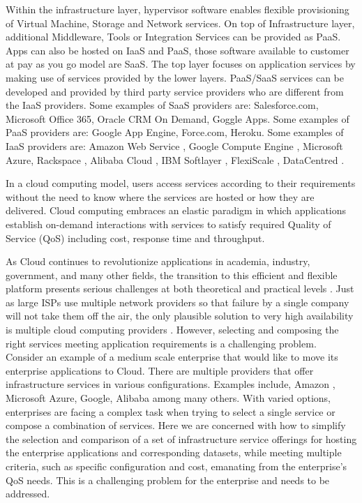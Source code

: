 Within the infrastructure layer, hypervisor software \cite{xen}
enables flexible provisioning of Virtual Machine, Storage and Network services.
On top of Infrastructure layer, additional Middleware, Tools or Integration Services can be provided as PaaS. Apps can also be hosted on IaaS and PaaS, those software available to customer at pay as you go model are SaaS.
The top layer focuses on application services by making
use of services provided by the lower layers. PaaS/SaaS
services can be developed and provided by third party
service providers who are different from the IaaS providers.
Some examples of SaaS providers are: Salesforce.com, Microsoft Office 365,
Oracle CRM On Demand, Goggle Apps.
Some examples of PaaS providers are: Google App Engine,
Force.com, Heroku. 
Some examples of IaaS providers are: Amazon Web Service \cite{aws}, Google Compute Engine \cite{google_cloud}, Microsoft Azure, Rackspace \cite{Rackspace}, Alibaba Cloud \cite{Alibaba}, IBM Softlayer \cite{IBMSoftLayer}, FlexiScale \cite{FlexiScale}, DataCentred \cite{DataCentred}.

In a cloud computing model, users access services according
to their requirements without the need to know where the
services are hosted or how they are delivered. 
Cloud computing embraces an elastic paradigm in which applications establish on-demand
interactions with services to satisfy required Quality of Service (QoS) including cost,
response time and throughput.

As Cloud continues to revolutionize applications in academia, industry, government, and many other fields, the transition to this efficient and flexible platform presents serious challenges at both theoretical and practical levels \cite{CloudComputingMethodologySystemsApplications}.
Just as large ISPs use multiple network providers so that failure by a single company
will not take them off the air,
the only plausible solution to very high availability
is multiple cloud computing providers \cite{Armbrust:2010:VCC:1721654.1721672}.
However, selecting and composing the right services
meeting application requirements is a challenging problem.
Consider an example of a medium scale enterprise that would like to move its
enterprise applications to Cloud.
There are multiple providers that offer infrastructure services in various configurations.
Examples include, Amazon , Microsoft Azure, Google, Alibaba among many others.
With varied options, enterprises are facing a complex task when trying to select a single service or compose a combination of services.
Here we are concerned with how to simplify the selection and comparison of a set of
infrastructure service offerings for hosting the enterprise applications and
corresponding datasets, while meeting multiple criteria, such as specific configuration
and cost, emanating from the enterprise’s QoS needs.
This is a challenging problem for the enterprise and needs to be addressed.

